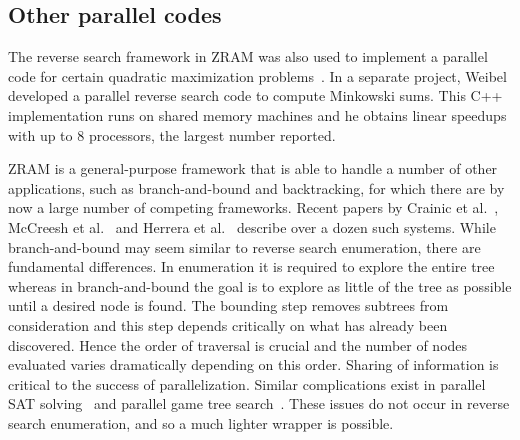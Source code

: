 \documentclass[a4paper,11pt]{article}   \usepackage{authblk} \usepackage[top=1.9cm,bottom=1.9cm,left=1.9cm,right=1.9cm]{geometry}
\newcommand{\progname}{\textsf}
\newcommand{\zram}{\progname{ZRAM}\xspace}
\begin{document}
\subsection{Other parallel codes}

The reverse search framework in \zram was also used to implement a parallel code for
certain quadratic maximization problems~\cite{FKL05}.
In a separate project, 
Weibel \cite{Weibel10} developed a parallel reverse search code to compute Minkowski sums.
This C++ implementation runs on shared memory machines and he obtains linear speedups with up to 8 processors,
the largest number reported.

\zram is a general-purpose framework that is able to handle a number of other applications, such
as branch-and-bound and backtracking, for which there are by now a large number of competing frameworks.
Recent papers by Crainic et al.~\cite{CLR06}, McCreesh et al.~\cite{MP15} and Herrera et al.~\cite{He17}
describe over a dozen such systems. While branch-and-bound may seem similar to reverse search enumeration, there
are fundamental differences. In enumeration it is required to explore the entire
tree whereas in branch-and-bound the goal is to explore as little of the tree as possible
until a desired node is found. The bounding step removes subtrees from consideration and
this step depends critically on what has already been discovered. Hence the order of
traversal is crucial and the number of nodes evaluated varies dramatically depending on this
order. Sharing of information is critical to the success of parallelization.
Similar complications exist in parallel SAT solving~\cite{HW12} and
parallel game tree search~\cite{HSN88}.
These issues do not occur in reverse search enumeration, and so a much lighter wrapper is possible.
\end{document}
